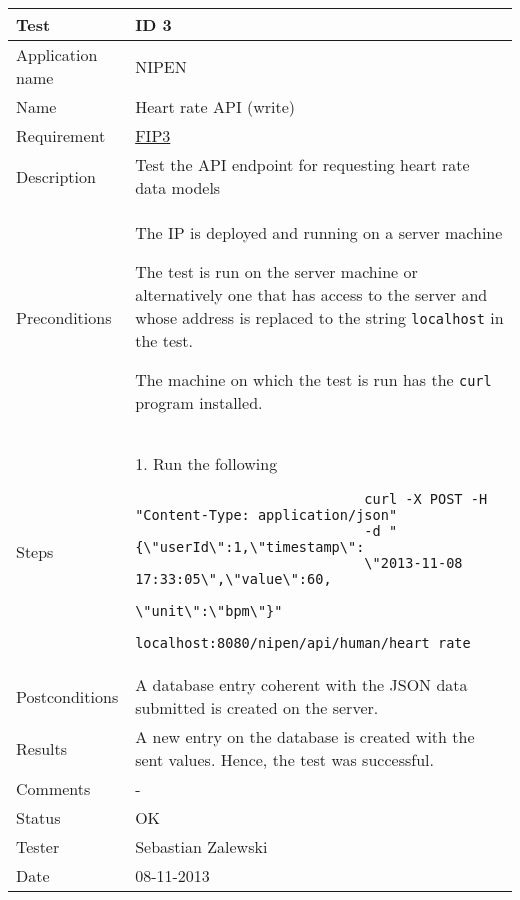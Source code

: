 \begin{table}
\begin{center}
\begin{tabular}{ | l | p{10cm} | }
	\hline
	\textbf{Test}	&	\textbf{ID 3} \\
	\hline\noalign{\smallskip}\noalign{\smallskip}\hline
	Application name	& NIPEN \\
	Name				& Heart rate API (write) \\
	Requirement			& \hyperref[table:reqip]{FIP3} \\
	Description			& Test the API endpoint for requesting heart rate data models \\
	Preconditions		&	\par The IP is deployed and running on a server machine
							\par The test is run on the server machine or alternatively
							one that has access to the server and whose address is replaced to the
							string \verb|localhost| in the test.
							\par The machine on which the test is run has the \verb|curl| program installed. \\
	Steps 				&	1. Run the following \begin{verbatim}
							curl -X POST -H "Content-Type: application/json" 
							-d "{\"userId\":1,\"timestamp\":
							\"2013-11-08 17:33:05\",\"value\":60,
							\"unit\":\"bpm\"}" 
							localhost:8080/nipen/api/human/heart_rate
							\end{verbatim} \\
	Postconditions		& A database entry coherent with the JSON data submitted is created on the server. \\
	Results				& A new entry on the database is created with the sent values.
						  Hence, the test was successful. \\
	Comments			& - \\
	Status				& OK \\
	Tester				& Sebastian Zalewski \\
	Date				& 08-11-2013 \\
	\hline
\end{tabular}
\end{center}
\end{table}

